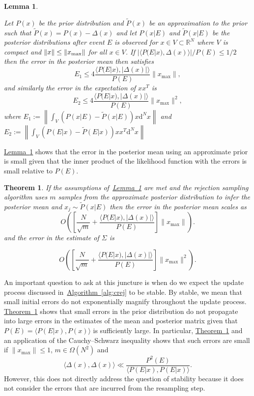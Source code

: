 \documentclass[twoside]{article}
\newtheorem{theorem}{Theorem}
\newtheorem{lemma}{Lemma}
\newcommand{\thm}[1]{\hyperref[thm:#1]{Theorem~\ref*{thm:#1}}}
\newcommand{\lem}[1]{\hyperref[lem:#1]{Lemma~\ref*{lem:#1}}}
\newcommand{\alg}[1]{\hyperref[alg:#1]{Algorithm~\ref*{alg:#1}}}
\begin{document}
\begin{lemma}
    \label{lem:errprop}

    Let $P(x)$ be the prior distribution and $\tilde{P}(x)$ be an approximation to the prior such that $\tilde{P}(x) = P(x) -\Delta(x)$ and let $P(x|E)$ and $\tilde{P}(x|E)$ be the posterior distributions after event $E$ is observed for $x\in V\subset \mathbb{R}^N$ where $V$ is compact and $\|x\|\le \|x_{\rm max}\|$ for all $x\in V$.  If $|\langle P(E|x),\Delta(x) \rangle|/P(E) \le 1/2$ then the error in the posterior mean then satisfies
    $$
    E_1 \le 4 \frac{\langle P(E|x), |\Delta(x)|\rangle}{P(E)}\|x_{\max}\|,
    $$
    and similarly the error in the expectation of $xx^T$ is
    $$
    E_2 \le 4 \frac{\langle P(E|x), |\Delta(x)|\rangle}{P(E)}\|x_{\max}\|^2,
    $$
where $E_1:=\left\|\int_V  (P(x|E) -\tilde{P}(x|E)) x \mathrm{d}^N x \right\|$ and $E_2 := \left\|\int_V  (P(E|x) -\tilde{P}(E|x)) xx^T \mathrm{d}^N x \right\|$
\end{lemma}

\lem{errprop} shows that the error in the posterior mean using an approximate prior is small given that the inner product of the likelihood function with the errors is small relative to $P(E)$. 

\begin{theorem}\label{thm:meanCov}
If the assumptions of~\lem{errprop} are met and the rejection sampling algorithm uses $m$ samples from the approximate posterior distribution to infer the posterior mean  and $x_j\sim \tilde{P}(x|E)$ then the error in the posterior mean scales as
$$
 O\left(\left[\frac{{N}}{\sqrt{m}} +\frac{\langle P(E|x), |\Delta(x)|\rangle}{P(E)}\right]\|x_{\max}\|\right).
$$
and the error in the estimate of $\Sigma$ is

$$
 O\left(\left[\frac{{N} }{\sqrt{m}} +\frac{\langle P(E|x), |\Delta(x)|\rangle}{P(E)}\right]\|x_{\max}\|^2\right).
$$
\end{theorem}


An important question to ask at this juncture is when do we expect the update process discussed in~\alg{crej} to be stable.  By stable, we mean that small initial errors do not exponentially magnify throughout the update process.  \thm{meanCov} shows that small errors in the prior distribution do not propagate into large errors in the estimates of the mean and posterior matrix given that $P(E)= \langle P(E|x),P(x)\rangle$ is sufficiently large.  In particular, \thm{meanCov} and an application of the Cauchy--Schwarz inequality shows that such errors are small if $\|x_{\max}\|\le 1$, $m\in \Omega(N^2)$ and 
$$
\langle\Delta(x),\Delta(x)\rangle \ll \frac{P^2(E)}{{\langle P(E|x),P(E|x)\rangle}}.
$$
However, this does not directly address the question of stability because it does not consider the errors that are incurred from the resampling step.
\end{document}
